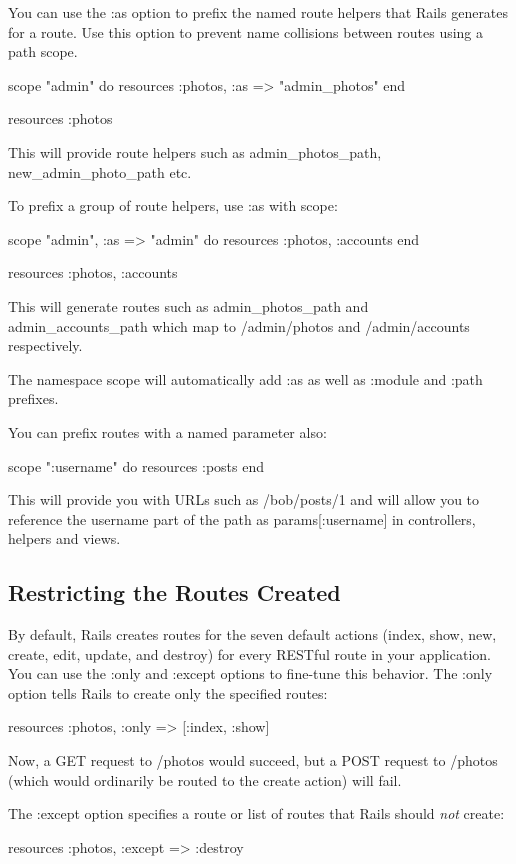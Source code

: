 \documentclass[10pt]{book}
\newenvironment{code}{%
  \scriptsize
    \verbatim
}{%
    \endverbatim
    \newline
}
\begin{document}
You can use the :as option to prefix the named route helpers  that Rails generates for a route. Use this option to prevent name  collisions between routes using a path scope.
\begin{code}
scope "admin" do
  resources :photos, :as => "admin_photos"
end
 
resources :photos
\end{code}

This will provide route helpers such as admin\_photos\_path, new\_admin\_photo\_path etc.

To prefix a group of route helpers, use :as with scope:
\begin{code}
scope "admin", :as => "admin" do
  resources :photos, :accounts
end
 
resources :photos, :accounts
\end{code}

This will generate routes such as admin\_photos\_path and admin\_accounts\_path which map to /admin/photos and /admin/accounts respectively.

The namespace scope will automatically add :as as well as :module and :path prefixes.

You can prefix routes with a named parameter also:
\begin{code}
scope ":username" do
  resources :posts
end
\end{code}

This will provide you with URLs such as /bob/posts/1 and will allow you to reference the username part of the path as params[:username] in controllers, helpers and views.

\subsection{ Restricting the Routes Created}

By default, Rails creates routes for the seven default actions  (index, show, new, create, edit, update, and destroy) for every RESTful  route in your application. You can use the :only and :except options to fine-tune this behavior. The :only option tells Rails to create only the specified routes:
\begin{code}
resources :photos, :only => [:index, :show]
\end{code}

Now, a GET request to /photos would succeed, but a POST request to /photos (which would ordinarily be routed to the create action) will fail.

The :except option specifies a route or list of routes that Rails should \emph{not} create:
\begin{code}
resources :photos, :except => :destroy
\end{code}
\end{document}
